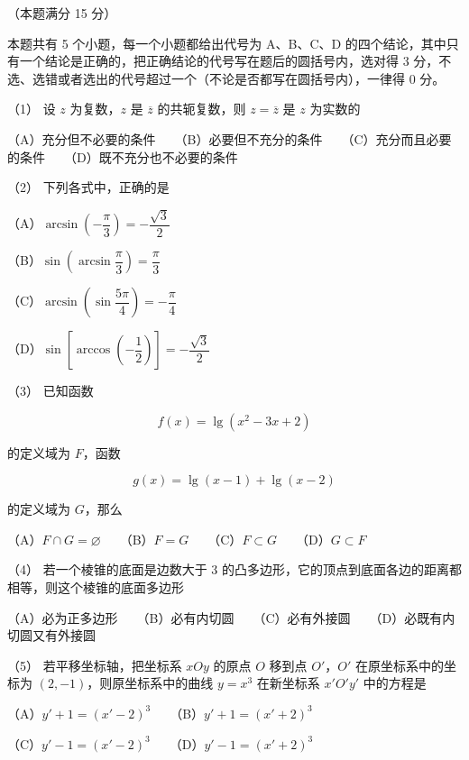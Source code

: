 \begin{question}
（本题满分 15 分）

本题共有 5 个小题，每一个小题都给出代号为 A、B、C、D 的四个结论，其中只有一个结论是正确的，把正确结论的代号写在题后的圆括号内，选对得 3 分，不选、选错或者选出的代号超过一个（不论是否都写在圆括号内），一律得 0 分。

（1） 设 $z$ 为复数，$z$ 是 $\overline z$ 的共轭复数，则 $z=\overline z$ 是 $z$ 为实数的

（A）充分但不必要的条件　　（B）必要但不充分的条件　　（C）充分而且必要的条件　　（D）既不充分也不必要的条件

（2） 下列各式中，正确的是

（A）$\arcsin\left(-\dfrac\pi3\right)=-\dfrac{\sqrt3}{2}$

（B）$\sin\left(\arcsin\dfrac\pi3\right)=\dfrac\pi3$

（C）$\arcsin\left(\sin\dfrac{5\pi}{4}\right)=-\dfrac\pi4$

（D）$\sin\left[\arccos\left(-\dfrac12\right)\right]=-\dfrac{\sqrt3}{2}$

（3） 已知函数

\nopagebreak[4]
\[
f(x)=\lg(x^2-3x+2)
\]

的定义域为 $F$，函数

\nopagebreak[4]
\[
g(x)=\lg(x-1)+\lg(x-2)
\]

的定义域为 $G$，那么

（A）$F\cap G=\varnothing$　　（B）$F=G$　　（C）$F\subset G$　　（D）$G\subset F$

（4） 若一个棱锥的底面是边数大于 3 的凸多边形，它的顶点到底面各边的距离都相等，则这个棱锥的底面多边形

（A）必为正多边形　　（B）必有内切圆　　（C）必有外接圆　　（D）必既有内切圆又有外接圆

（5） 若平移坐标轴，把坐标系 $xOy$ 的原点 $O$ 移到点 $O'$，$O'$ 在原坐标系中的坐标为 $(2,-1)$，则原坐标系中的曲线 $y=x^3$ 在新坐标系 $x'O'y'$ 中的方程是

（A）$y'+1=(x'-2)^3$　　（B）$y'+1=(x'+2)^3$

（C）$y'-1=(x'-2)^3$　　（D）$y'-1=(x'+2)^3$

\Needspace{0.4\textheight}
\end{question}
